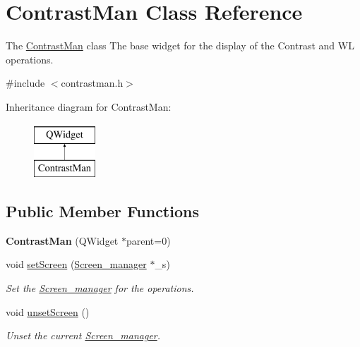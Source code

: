 \hypertarget{classContrastMan}{}\section{Contrast\+Man Class Reference}
\label{classContrastMan}


The \mbox{\hyperlink{classContrastMan}{Contrast\+Man}} class The base widget for the display of the Contrast and WL operations.  




{\ttfamily \#include $<$contrastman.\+h$>$}

Inheritance diagram for Contrast\+Man\+:\begin{figure}[H]
\begin{center}
\leavevmode
\includegraphics[height=2.000000cm]{classContrastMan}
\end{center}
\end{figure}
\subsection*{Public Member Functions}
\begin{DoxyCompactItemize}
\item 
\mbox{\label{classContrastMan_acb952aac920f10c9eef753cb6d09ebf3}} 
{\bfseries Contrast\+Man} (Q\+Widget $\ast$parent=0)
\item 
\mbox{\label{classContrastMan_a253a84b069a8334d5c0f3b367f70e2cb}} 
void \mbox{\hyperlink{classContrastMan_a253a84b069a8334d5c0f3b367f70e2cb}{set\+Screen}} (\mbox{\hyperlink{classScreen__manager}{Screen\+\_\+manager}} $\ast$\+\_\+s)
\begin{DoxyCompactList}\small\item\em Set the \mbox{\hyperlink{classScreen__manager}{Screen\+\_\+manager}} for the operations. \end{DoxyCompactList}\item 
\mbox{\label{classContrastMan_ab84677343dce962a03ec0e755c006f84}} 
void \mbox{\hyperlink{classContrastMan_ab84677343dce962a03ec0e755c006f84}{unset\+Screen}} ()
\begin{DoxyCompactList}\small\item\em Unset the current \mbox{\hyperlink{classScreen__manager}{Screen\+\_\+manager}}. \end{DoxyCompactList}\end{DoxyCompactItemize}
